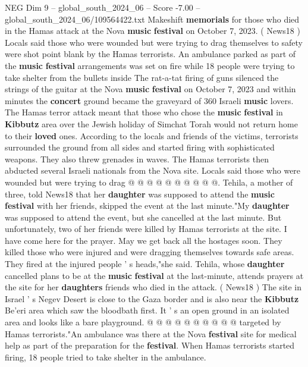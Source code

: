 \begin{textsample}{NEG Dim 9 – global\_south\_2024\_06 – Score -7.00 – global\_south\_2024\_06/109564422.txt}  \label{ex:f9_neg_352}
Makeshift \textbf{memorials} for those who died in the Hamas attack at the Nova \textbf{music} \textbf{festival} on October 7, 2023. ( News18 ) Locals said those who were wounded but were trying to drag themselves to safety were shot point blank by the Hamas terrorists.
An ambulance parked as part of the \textbf{music} \textbf{festival} arrangements was set on fire while 18 people were trying to take shelter from the bullets inside The rat-a-tat firing of guns silenced the strings of the guitar at the Nova \textbf{music} \textbf{festival} on October 7, 2023 and within minutes the \textbf{concert} ground became the graveyard of 360 Israeli \textbf{music} lovers.
The Hamas terror attack meant that those who chose the \textbf{music} \textbf{festival} in \textbf{Kibbutz} area over the Jewish holiday of Simchat Torah would not return home to their \textbf{loved} ones.
According to the locals and friends of the victims, terrorists surrounded the ground from all sides and started firing with sophisticated weapons.
They also threw grenades in waves.
The Hamas terrorists then abducted several Israeli nationals from the Nova site.
Locals said those who were wounded but were trying to drag @ @ @ @ @ @ @ @ @ @.
Tehila, a mother of three, told News18 that her \textbf{daughter} was supposed to attend the \textbf{music} \textbf{festival} with her friends, skipped the event at the last minute."My \textbf{daughter} was supposed to attend the event, but she cancelled at the last minute.
But unfortunately, two of her friends were killed by Hamas terrorists at the site.
I have come here for the prayer.
May we get back all the hostages soon.
They killed those who were injured and were dragging themselves towards safe areas.
They fired at the injured people ' s heads,"she said.
Tehila, whose \textbf{daughter} cancelled plans to be at the \textbf{music} \textbf{festival} at the last-minute, attends prayers at the site for her \textbf{daughters} friends who died in the attack. ( News18 ) The site in Israel ' s Negev Desert is close to the Gaza border and is also near the \textbf{Kibbutz} Be'eri area which saw the bloodbath first.
It ' s an open ground in an isolated area and looks like a bare playground. @ @ @ @ @ @ @ @ @ @ targeted by Hamas terrorists."An ambulance was there at the Nova \textbf{festival} site for medical help as part of the preparation for the \textbf{festival}.
When Hamas terrorists started firing, 18 people tried to take shelter in the ambulance.

\end{textsample}
